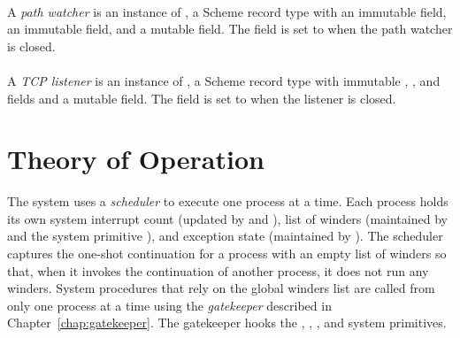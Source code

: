 \paragraph {}
A \emph{path watcher} is an instance of
, a Scheme record type with an immutable
 field, an immutable  field, and a
mutable  field. The  field is set to
 when the path watcher is closed.

\paragraph {}
A \emph{TCP listener} is an instance of
, a Scheme record type with immutable ,
, and  fields and a mutable
 field. The  field is set to  when
the listener is closed.

\section {Theory of Operation}\label{sec:erlang-theory}

The system uses a \emph{scheduler} to execute one
process at a time. Each process holds its own system interrupt count
(updated by  and ),
list of winders (maintained by  and the system
primitive ), and exception state (maintained
by ). The scheduler captures the
one-shot continuation for a process with an empty list of winders so
that, when it invokes the continuation of another process, it does not
run any winders.  \mitigation
System procedures that rely on the global winders list are called from
only one process at a time using the
\emph{gatekeeper} described in
Chapter~\ref{chap:gatekeeper}. The gatekeeper hooks the ,
, , and  system
primitives.

